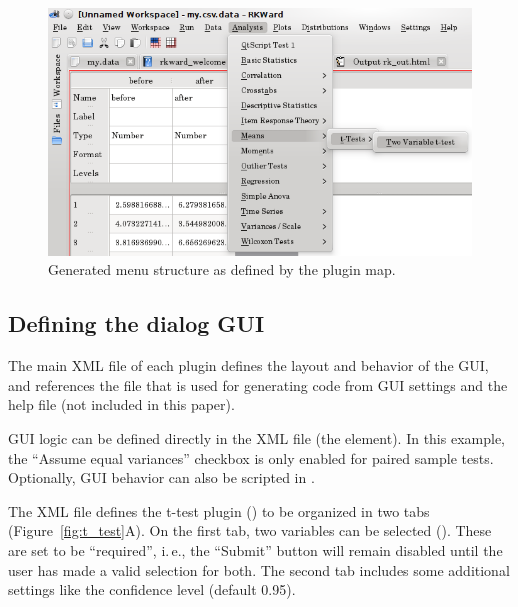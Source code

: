 \begin{figure}[t!]
 \centering
 \includegraphics{./figures/ttest-gui-example.png}
 \caption{Generated menu structure as defined by the plugin map.}
 \label{fig:ttest-gui-example}
\end{figure}


\subsection {Defining the dialog GUI}
\label{sec:defining_dialog_ui}
The main XML file of each plugin defines the layout and behavior of the GUI, and references the
 file that is used for generating  code from GUI settings and the help file (not included in this paper).

GUI logic can be defined directly in the XML file (the  element).
In this example, the ``Assume equal variances'' checkbox is only enabled for paired sample tests.
Optionally, GUI behavior can also be scripted in .

The XML file defines the t-test plugin () to be organized in two tabs (Figure~\ref{fig:t_test}A).
On the first tab, two variables can be selected (). These are set to be ``required'', i.\,e.,
the ``Submit'' button will remain disabled until the user has made a valid selection for both. The second tab includes some
additional settings like the confidence level (default 0.95).

